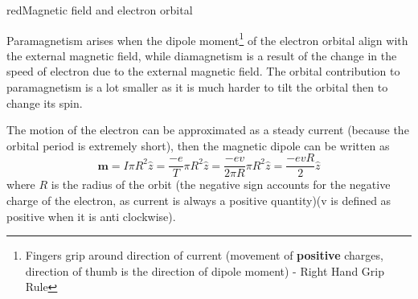 \begin{mybox}{red}{Magnetic field and electron orbital}
\begin{center}

    \end{center}

    Paramagnetism arises when the dipole moment\footnote{Fingers grip around direction of current (movement of \textbf{positive} charges, direction of thumb is the direction of dipole moment) - Right Hand Grip Rule} of the electron orbital align with the external magnetic field, while diamagnetism is a result of the change in the speed of electron due to the external magnetic field. The orbital contribution to paramagnetism is a lot smaller as it is much harder to tilt the orbital then to change its spin.

    The motion of the electron can be approximated as a steady current (because the orbital period is extremely short), then the magnetic dipole can be written as
    \begin{equation}
        \mathbf{m}=I\pi R^2 \hat{z}= \frac{-e}{T}\pi R^2 \hat{z} =\frac{-ev}{2\pi R}\pi R^2 \hat{z}=\frac{-evR}{2}\hat{z}
    \end{equation}
    where $R$ is the radius of the orbit (the negative sign accounts for the negative charge of the electron, as current is always a positive quantity)(v is defined as positive when it is anti clockwise).


\end{mybox}
